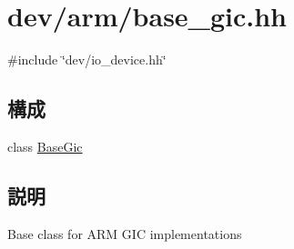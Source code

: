 \hypertarget{base__gic_8hh}{
\section{dev/arm/base\_\-gic.hh}
\label{base__gic_8hh}
}
{\ttfamily \#include \char`\"{}dev/io\_\-device.hh\char`\"{}}\par
\subsection*{構成}
\begin{DoxyCompactItemize}
\item 
class \hyperlink{classBaseGic}{BaseGic}
\end{DoxyCompactItemize}


\subsection{説明}
Base class for ARM GIC implementations 